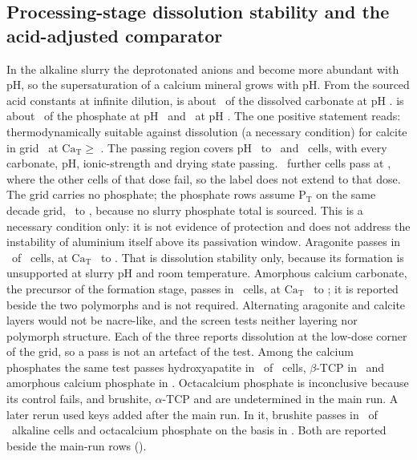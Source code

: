 \subsection{Processing-stage dissolution stability and the acid-adjusted comparator}\label{sec:res-dissolution}
In the alkaline slurry the deprotonated anions  and  become more abundant with pH, so the supersaturation of a calcium mineral grows with pH. %
From the sourced acid constants at infinite dilution,  is about \NumSpecCarbonateLow\ of the dissolved carbonate at pH \NumSpecPhLow. %
 is about \NumSpecPhosphateLow\ of the phosphate at pH \NumSpecPhLow\ and \NumSpecPhosphateMid\ at pH \NumSpecPhMid. %
The one positive statement reads: thermodynamically suitable against dissolution (a necessary condition) for calcite in grid \NumRegGridId\ at $\mathrm{Ca_T}\ge$ \NumRegWindowFullLoCalcite. %
The passing region covers pH \NumRegSlurryPhLow\ to \NumRegSlurryPhHigh\ and \NumRegSlurryPassFullCalcite\ cells, with every carbonate, pH, ionic-strength and drying state passing. %
\NumRegSlurryPassExtraCalcite\ further cells pass at \NumRegWindowLoCalcite, where the other cells of that dose fail, so the label does not extend to that dose. %
The grid carries no phosphate; the phosphate rows assume $\mathrm{P_T}$ on the same decade grid, \NumRegWindowPLo\ to \NumRegWindowPHi, because no slurry phosphate total is sourced. %
This is a necessary condition only: it is not evidence of protection and does not address the instability of aluminium itself above its passivation window. %
Aragonite passes in \NumRegSlurryPassAragonite\ of \NumRegSlurryCellsAragonite\ cells, at $\mathrm{Ca_T}$ \NumRegWindowLoAragonite\ to \NumRegWindowHiAragonite. %
That is dissolution stability only, because its formation is unsupported at slurry pH and room temperature\cite{nahi2022polyamines,hanifa2025effects}. %
Amorphous calcium carbonate, the precursor of the formation stage, passes in \NumRegSlurryPassAcc\ cells, at $\mathrm{Ca_T}$ \NumRegWindowLoAcc\ to \NumRegWindowHiAcc; it is reported beside the two polymorphs and is not required. %
Alternating aragonite and calcite layers would not be nacre-like, and the screen tests neither layering nor polymorph structure. %
Each of the three reports dissolution at the low-dose corner of the grid, so a pass is not an artefact of the test. %
Among the calcium phosphates the same test passes hydroxyapatite in \NumRegSlurryPassHap\ of \NumRegSlurryCellsHap\ cells, $\beta$-TCP in \NumRegSlurryPassBtcp\ and amorphous calcium phosphate in \NumRegSlurryPassAcp. %
Octacalcium phosphate is inconclusive because its control fails, and brushite, $\alpha$-TCP and  are undetermined in the main run. %
A later rerun used keys added after the main run. %
In it, brushite passes in \NumRegRerunBrushiteAlkalineRerun\ of \NumRegRerunBrushiteAlkalineCells\ alkaline cells and octacalcium phosphate on the  basis in \NumRegRerunOcpCahAlkalineRerun. %
Both are reported beside the main-run rows (). %

